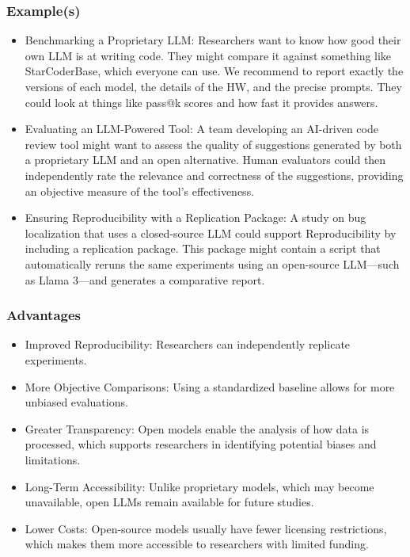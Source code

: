 \subsubsection{Example(s)}
\begin{itemize}
    \item Benchmarking a Proprietary LLM: Researchers want to know how good their own LLM is at writing code. They might compare it against something like StarCoderBase, which everyone can use. We recommend to report exactly the versions of each model, the details of the HW, and the precise prompts. They could look at things like pass@k scores and how fast it provides answers. 
    \item Evaluating an LLM-Powered Tool: A team developing an AI-driven code review tool might want to assess the quality of suggestions generated by both a proprietary LLM and an open alternative. Human evaluators could then independently rate the relevance and correctness of the suggestions, providing an objective measure of the tool's effectiveness.
    \item Ensuring Reproducibility with a Replication Package: A study on bug localization that uses a closed-source LLM could support Reproducibility by including a replication package. This package might contain a script that automatically reruns the same experiments using an open-source LLM—such as Llama 3—and generates a comparative report.
\end{itemize}

\subsubsection{Advantages}
\begin{itemize}
    \item	Improved Reproducibility: Researchers can independently replicate experiments.
    \item	More Objective Comparisons: Using a standardized baseline allows for more unbiased evaluations.
    \item	Greater Transparency: Open models enable the analysis of how data is processed, which supports researchers in identifying potential biases and limitations.
    \item	Long-Term Accessibility: Unlike proprietary models, which may become unavailable, open LLMs remain available for future studies.
    \item	Lower Costs: Open-source models usually have fewer licensing restrictions, which makes them more accessible to researchers with limited funding.
\end{itemize}


